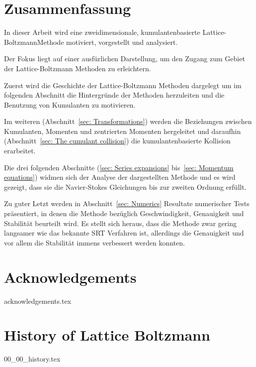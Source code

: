 \documentclass[12pt,a4paper,twoside]{article}
\begin{document}
\section*{Zusammenfassung}
In dieser Arbeit wird eine zweidimensionale, kumulantenbasierte Lattice-Boltzmann\linebreak Methode motiviert, vorgestellt und analysiert.

Der Fokus liegt auf einer ausf\"urlichen Darstellung, um den Zugang zum Gebiet der Lattice-Boltzmann Methoden zu erleichtern.

Zuerst wird die Geschichte der Lattice-Boltzmann Methoden dargelegt um im folgenden Abschnitt die Hintergr\"unde der Methoden herzuleiten und die Benutzung von Kumulanten zu motivieren.

Im weiteren (Abschnitt~\ref{sec: Transformations}) werden die Beziehungen zwischen Kumulanten, Momenten und zentrierten Momenten hergeleitet und daraufhin (Abschnitt~\ref{sec: The cumulant collision}) die kumulantenbasierte Kollision erarbeitet.

Die drei folgenden Abschnitte (\ref{sec: Series expansions} bis~\ref{sec: Momentum equations}) widmen sich der Analyse der dargestellten Methode und es wird gezeigt, dass sie die Navier-Stokes Gleichungen bis zur zweiten Ordnung erf\"ullt.

Zu guter Letzt werden in Abschnitt~\ref{sec: Numerics} Resultate numerischer Tests pr\"asentiert, in denen die Methode bez\"uglich Geschwindigkeit, Genauigkeit und Stabilit\"at beurteilt wird.
Es stellt sich heraus, dass die Methode zwar gering langsamer wie das bekannte SRT Verfahren ist, allerdings die Genauigkeit und vor allem die Stabilit\"at immens verbessert werden konnten.

\newpage
\tableofcontents
\newpage

\section*{Acknowledgements}
{acknowledgements.tex}
\newpage

\printglossaries{}
\newpage

\pagestyle{headings}
\section{History of Lattice Boltzmann}
\label{sec: History of Lattice Boltzmann}
{00_00_history.tex}
\end{document}

